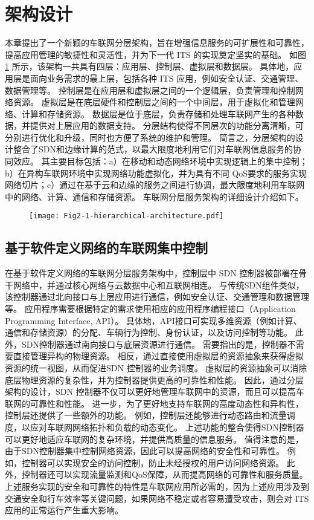 \section{架构设计}\label{section 2-2}

本章提出了一个新颖的车联网分层架构，旨在增强信息服务的可扩展性和可靠性，提高应用管理的敏捷性和灵活性，并为下一代 ITS 的实现奠定坚实的基础。
如图 \ref{fig 2-1} 所示，该架构一共具有四层：应用层、控制层、虚拟层和数据层。
具体地，应用层是面向业务需求的最上层，包括各种 ITS 应用，例如安全认证、交通管理、数据管理等。
控制层是在应用层和虚拟层之间的一个逻辑层，负责管理和控制网络资源。
虚拟层是在底层硬件和控制层之间的一个中间层，用于虚拟化和管理网络、计算和存储资源。
数据层是位于底层，负责存储和处理车联网产生的各种数据，并提供对上层应用的数据支持。
分层结构使得不同层次的功能分离清晰，可分别进行优化和升级，同时也方便了系统的维护和管理。
简言之，分层架构的设计整合了SDN和边缘计算的范式，以最大限度地利用它们对车联网信息服务的协同效应。
其主要目标包括：a）在移动和动态网络环境中实现逻辑上的集中控制；b）在异构车联网环境中实现网络功能虚拟化，并为具有不同 QoS要求的服务实现网络切片；c）通过在基于云和边缘的服务之间进行协调，最大限度地利用车联网中的网络、计算、通信和存储资源。
车联网分层服务架构的详细设计介绍如下。

\begin{figure}[h] 
	\centering
	\texttt{[image: Fig2-1-hierarchical-architecture.pdf]}
	\label{fig 2-1}
\end{figure}

\subsection{基于软件定义网络的车联网集中控制}

在基于软件定义网络的车联网分层服务架构中，控制层中 SDN 控制器被部署在骨干网络中，并通过核心网络与云数据中心和互联网相连。
与传统SDN组件类似，该控制器通过北向接口与上层应用进行通信，例如安全认证、交通管理和数据管理等。
应用程序需要根据特定的需求使用相应的应用程序编程接口（Application Programming Interface, API）。
具体地，API接口可实现多维资源（例如计算、通信和存储资源）的分配、车辆行为控制、身份认证，以及访问控制等功能。
此外，SDN控制器通过南向接口与底层资源进行通信。
需要指出的是，控制器不需要直接管理异构的物理资源。
相反，通过直接使用虚拟层的资源抽象来获得虚拟资源的统一视图，从而促进SDN 控制器的业务调度。
虚拟层的资源抽象可以消除底层物理资源的复杂性，并为控制器提供更高的可靠性和性能。
因此，通过分层架构的设计，SDN 控制器不仅可以更好地管理车联网中的资源，而且可以提高车联网的可靠性和性能。
进一步，为了更好地支持车联网的高度动态性和异构性，控制层还提供了一些额外的功能。
例如，控制层还能够进行动态路由和流量调度，以应对车联网网络拓扑和负载的动态变化。
上述功能的整合使得SDN控制器可以更好地适应车联网的复杂环境，并提供高质量的信息服务。
值得注意的是，由于SDN控制器集中控制网络资源，因此可以提高网络的安全性和可靠性。
例如，控制器可以实现安全的访问控制，防止未经授权的用户访问网络资源。
此外，控制器还可以实现流量监测和QoS保障，从而提高网络的可靠性和服务质量。
上述服务实现的安全和可靠性的特性是车联网应用所必需的，因为上述应用涉及到交通安全和行车效率等关键问题，如果网络不稳定或者容易遭受攻击，则会对 ITS 应用的正常运行产生重大影响。

